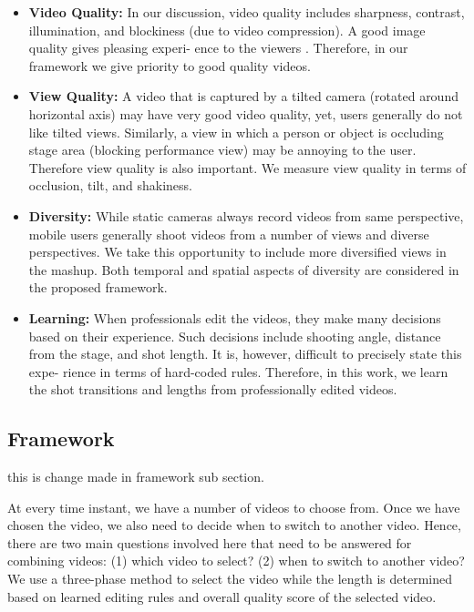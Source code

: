 \documentclass{new}
\begin{document}
\begin{itemize}
\item \textbf{Video Quality:} In our discussion, video quality includes
sharpness, contrast, illumination, and blockiness (due to video
compression). A good image quality gives pleasing experi-
ence to the viewers \cite{10}. Therefore, in our framework we
give priority to good quality videos.

\item \textbf{View Quality:} A video that is captured by a tilted camera
(rotated around horizontal axis) may have very good video
quality, yet, users generally do not like tilted views. Similarly, a view in which a person or object is occluding stage
area (blocking performance view) may be annoying to the user. Therefore view quality is also important. We measure
view quality in terms of occlusion, tilt, and shakiness.

\item \textbf{Diversity:} While static cameras always record videos from
same perspective, mobile users generally shoot videos from
a number of views and diverse perspectives. We take this
opportunity to include more diversified views in the mashup.
Both temporal and spatial aspects of diversity are considered
in the proposed framework.

\item \textbf{Learning:} When professionals edit the videos, they make
many decisions based on their experience. Such decisions
include shooting angle, distance from the stage, and shot
length. It is, however, difficult to precisely state this expe-
rience in terms of hard-coded rules. Therefore, in this work,
we learn the shot transitions and lengths from professionally
edited videos.
\end{itemize}
  
\subsection{Framework}
this is change made in framework sub section.

At every time instant, we have a number of videos to choose
from. Once we have chosen the video, we also need to decide when
to switch to another video. Hence, there are two main questions
involved here that need to be answered for combining videos: (1)
which video to select? (2) when to switch to another video? We
use a three-phase method to select the video while the length is
determined based on learned editing rules and overall quality score
of the selected video.
\end{document}
